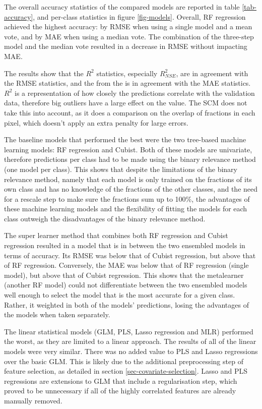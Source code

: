 \documentclass[review,authoryear,3p]{elsarticle}
\begin{document}
The overall accuracy statistics of the compared models are reported in table \ref{tab-accuracy}, and per-class statistics in figure \ref{fig-models}.
Overall, \gls{RF} regression achieved the highest accuracy: by \gls{RMSE} when using a single model and a mean vote, and by \gls{MAE} when using a median vote.
The combination of the three-step model and the median vote resulted in a decrease in \gls{RMSE} without impacting \gls{MAE}.

The results show that the $R^2$ statistics, especially $R^2_{NSE}$, are in agreement with the \gls{RMSE} statistics, and the  from the  is in agreement with the \gls{MAE} statistics.
$R^2$ is a representation of how closely the predictions correlate with the validation data, therefore big outliers have a large effect on the value.
The \gls{SCM} does not take this into account, as it does a comparison on the overlap of fractions in each pixel, which doesn't apply an extra penalty for large errors.

The baseline models that performed the best were the two tree-based machine learning models: \gls{RF} regression and Cubist.
Both of these models are univariate, therefore predictions per class had to be made using the binary relevance method (one model per class).
This shows that despite the limitations of the binary relevance method, namely that each model is only trained on the fractions of its own class and has no knowledge of the fractions of the other classes, and the need for a rescale step to make sure the fractions sum up to 100\%, the advantages of these machine learning models and the flexibility of fitting the models for each class outweigh the disadvantages of the binary relevance method.

The super learner method that combines both \gls{RF} regression and Cubist regression resulted in a model that is in between the two ensembled models in terms of accuracy.
Its \gls{RMSE} was below that of Cubist regression, but above that of \gls{RF} regression.
Conversely, the \gls{MAE} was below that of \gls{RF} regression (single model), but above that of Cubist regression.
This shows that the metalearner (another \gls{RF} model) could not differentiate between the two ensembled models well enough to select the model that is the most accurate for a given class.
Rather, it weighted in both of the models' predictions, losing the advantages of the models when taken separately.

The linear statistical models (\gls{GLM}, \gls{PLS}, Lasso regression and \gls{MLR}) performed the worst, as they are limited to a linear approach.
The results of all of the linear models were very similar.
There was no added value to \gls{PLS} and Lasso regressions over the basic \gls{GLM}.
This is likely due to the additional preprocessing step of feature selection, as detailed in section \ref{sec-covariate-selection}.
Lasso and \gls{PLS} regressions are extensions to \gls{GLM} that include a regularisation step, which proved to be unnecessary if all of the highly correlated features are already manually removed.
\end{document}
